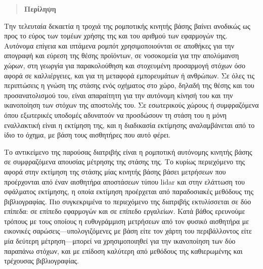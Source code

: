 \singlespace

\vfill
\begin{quotation}
\begin{center}
\textbf{Περίληψη}
\end{center}
\noindent
\end{quotation}

Την τελευταία δεκαετία η τροχιά της ρομποτικής κινητής βάσης βαίνει ανοδικώς ως
προς το εύρος των τομέων χρήσης της και του αριθμού των εφαρμογών της. Αυτόνομα
επίγεια και ιπτάμενα ρομπότ χρησιμοποιούνται σε αποθήκες για την απογραφή και
εύρεση της θέσης προϊόντων, σε νοσοκομεία για την απολύμανση χώρων, στη γεωργία
για παρακολούθηση και στοχευμένη προσαρμογή στόχων όσο αφορά σε καλλιέργειες,
και για τη μεταφορά εμπορευμάτων ή ανθρώπων. Σε όλες τις περιπτώσεις η γνώση
της στάσης ενός οχήματος στο χώρο, δηλαδή της θέσης και του προσανατολισμού
του, είναι απαραίτητη για την αυτόνομη κίνησή του και την ικανοποίηση των
στόχων της αποστολής του. Σε εσωτερικούς χώρους ή συμφραζόμενα όπου εξωτερικές
υποδομές αδυνατούν να προσδώσουν τη στάση του η μόνη εναλλακτική είναι η
εκτίμηση της, και η διαδικασία εκτίμησης αναλαμβάνεται από το ίδιο το όχημα, με
βάση τους αισθητήρες που αυτό φέρει.

Το αντικείμενο της παρούσας διατριβής είναι η ρομποτική αυτόνομης κινητής βάσης
σε συμφραζόμενα απουσίας μέτρησης της στάσης της. Το κυρίως περιεχόμενο της
αφορά στην εκτίμηση της στάσης μίας κινητής βάσης βάσει μετρήσεων που
προέρχονται από έναν αισθητήρα αποστάσεων τύπου lidar και στην ελάττωση του
σφάλματος εκτίμησης, η οποία εκτίμηση προέρχεται από παραδοσιακές μεθόδους της
βιβλιογραφίας. Πιο συγκεκριμένα το περιεχόμενο της διατριβής εκτυλίσσεται σε
δύο επίπεδα: σε επίπεδο εφαρμογών και σε επίπεδο εργαλείων.  Κατά βάθος
ερευνούμε τρόπους με τους οποίους η ευθυγράμμιση μετρήσεων από τον φυσικό
αισθητήρα με εικονικές σαρώσεις---υπολογιζόμενες με βάση είτε τον χάρτη του
περιβάλλοντος είτε μία δεύτερη μέτρηση---μπορεί να χρησιμοποιηθεί για την
ικανοποίηση των δύο παραπάνω στόχων, και με επίδοση καλύτερη από μεθόδους της
καθιερωμένης και τρέχουσας βιβλιογραφίας.

